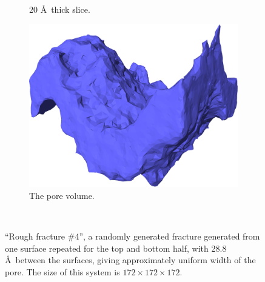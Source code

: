 \begin{figure}[!p]
{\begin{subfigure}[t]{\myfigwidth}
            \caption{20 \AA\ thick slice.}%
        \end{subfigure}%
        \hspace{\myhfillwidth}%
        \begin{subfigure}[t]{\myfigwidth}%
            \centering%
            \includegraphics[width=\textwidth]{images/systems/trimmed-rough_fracture05_09}%
            \caption{The pore volume.}%
        \end{subfigure}%
    }%
    \vspace{10pt}\\%
    \caption{%
        ``Rough fracture \#4'', a randomly generated fracture generated from one surface repeated for the top and bottom half, with 28.8 \AA\ between the surfaces, giving approximately uniform width of the pore.  The size of this system is $172 \times 172 \times 172$. %
        \label{fig:renderings_rough_fracture05}%
    }%
\end{figure}%


